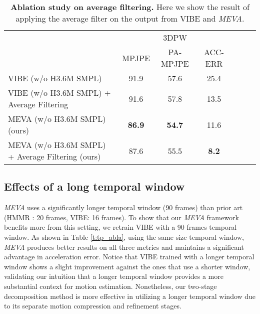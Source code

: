 \documentclass[runningheads]{llncs}
\begin{document}
\begin{table}[!thb]
\caption{\textbf{Ablation study on average filtering.} Here we show the result of applying the average filter on the output from VIBE \cite{vibe} and \textit{MEVA}. } \label{t:smooth_abla} 
\centering
\resizebox{3 in}{!} {
\begin{tabular}{l|c|c|c|c|c|r}
\hline
\multicolumn{1}{c|}{\multirow{2}{*}{}} & \multicolumn{3}{c|}{3DPW } \\ \cline{2-4} 
\multicolumn{1}{c|}{} & MPJPE  & PA-MPJPE  &  ACC-ERR  \\ \hline
     VIBE (w/o H3.6M SMPL) \cite{vibe}  & 91.9 & 57.6 & 25.4  \\
     VIBE (w/o H3.6M SMPL)  \cite{vibe} + Average Filtering & 91.6 & 57.8 & 13.5  \\
     MEVA (w/o H3.6M SMPL)  (ours) & \textbf{86.9} & \textbf{54.7} & 11.6  \\
     MEVA (w/o H3.6M SMPL) + Average Filtering (ours) & 87.6 & 55.5 & \textbf{8.2}  \\
     \hline
\end{tabular}}
\end{table}









\subsection{Effects of a long temporal window}

\textit{MEVA} uses a significantly longer temporal window (90 frames) than prior art (HMMR \cite{hmmr}: 20 frames, VIBE\cite{vibe}: 16 frames). To show that our \textit{MEVA} framework benefits more from this setting, we retrain VIBE with a 90 frames temporal window. As shown in Table \ref{t:tp_abla}, using the same size temporal window, \textit{MEVA} produces better results on all three metrics and maintains a significant advantage in acceleration error. Notice that VIBE trained with a longer temporal window shows a slight improvement against the ones that use a shorter window, validating our intuition that a longer temporal window provides a more substantial context for motion estimation. Nonetheless, our two-stage decomposition method is more effective in utilizing a longer temporal window due to its separate motion compression and refinement stages.
\end{document}
